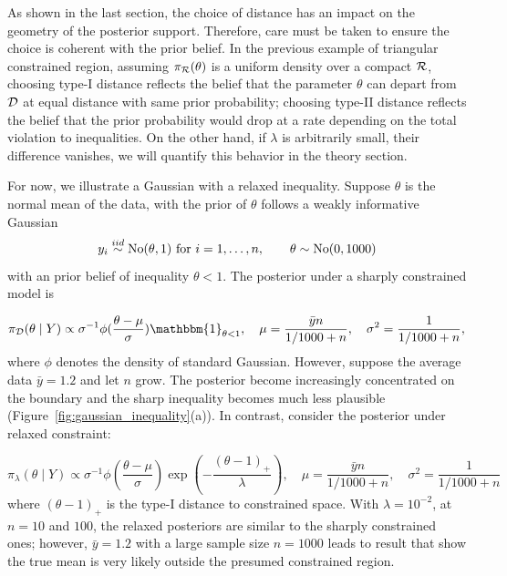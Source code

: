 \documentclass[10pt,fleqn]{article}
\DeclareMathOperator{\1}{\mathbbm{1}} \DeclareMathOperator{\bigO}{\mc O}
\begin{document}
As shown in the last section, the choice of distance has an impact on the geometry of the posterior support. Therefore, care must be taken to ensure the choice is coherent with the prior belief. In the previous example of triangular constrained region, assuming $\pi_{\mathcal{R}}(\theta)$ is a uniform density over a compact $\mathcal{R}$, choosing type-I distance reflects the belief that the parameter $\theta$ can depart from $\mathcal{D}$ at equal distance with same prior probability; choosing type-II distance reflects the belief that the prior probability would drop at a rate depending on the total violation to inequalities. On the other hand, if $\lambda$ is arbitrarily small, their difference  vanishes, we will quantify this behavior in the theory section.

For now, we illustrate a Gaussian with a relaxed inequality. Suppose $\theta$ is the normal mean of the data, with the prior of $\theta$ follows a weakly informative Gaussian
 $$y_i \stackrel{iid}{\sim} \operatorname{No}(\theta,1) \text{ for } i =1,\ldots,n, \qquad \theta \sim\operatorname{No}(0, 1000)$$ 
 with an prior belief of inequality $\theta<1$. The posterior under a sharply constrained model is

$$ \pi_{\mc D}(\theta \mid Y) \propto {\sigma^{-1}}\phi(\frac{\theta- \mu}{\sigma}) \mathbbm{1}_{\theta<1}, \quad \mu=    \frac{ \bar yn}{ 1/1000 + n },   \quad \sigma^2 = \frac{1}{ 1/1000 + n },$$
where $\phi$ denotes the density of standard Gaussian. 
However, suppose the average data $\bar y=1.2$ and let $n$ grow. The posterior become increasingly concentrated on the boundary and the sharp inequality becomes much less plausible (Figure~\ref{fig:gaussian_inequality}(a)). In contrast, consider the posterior under relaxed constraint:

$$ \pi_{\lambda}(\theta \mid Y) \propto {\sigma^{-1}}\phi(\frac{\theta- \mu}{\sigma}) \exp(-\frac{(\theta-1)_+ }{\lambda}) , \quad \mu=    \frac{ \bar y n}{ 1/1000 + n },   \quad \sigma^2 = \frac{1}{ 1/1000 + n }$$
where $(\theta-1)_+$ is the type-I distance to constrained space. With $\lambda=10^{-2}$, at $n=10$ and $100$, the relaxed posteriors are similar to the sharply constrained
ones; however, $\bar y=1.2$ with a large sample size $n=1000$ leads to result that show the true mean is
very likely outside the presumed constrained region.
\end{document}
